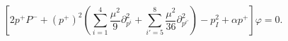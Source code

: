 \begin{equation} \label{LEE}
\left[ 2 p^+ P^- + (p^+)^2 \left(\sum_{i = 1}^{4}\frac{\mu^2}{9}
\partial_{p^i}^2  + \sum_{i'=5}^8 \frac{\mu^2}{36} \partial_{p^{i'}}^2
\right) - p_I^2 + \alpha p^+\right] \varphi = 0.
\end{equation}

